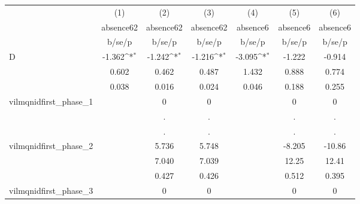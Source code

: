 {
\def\sym#1{\ifmmode^{#1}\else\(^{#1}\)\fi}
\begin{tabular}{l*{6}{c}}
\hline\hline
            &\multicolumn{1}{c}{(1)}&\multicolumn{1}{c}{(2)}&\multicolumn{1}{c}{(3)}&\multicolumn{1}{c}{(4)}&\multicolumn{1}{c}{(5)}&\multicolumn{1}{c}{(6)}\\
            &\multicolumn{1}{c}{absence62}&\multicolumn{1}{c}{absence62}&\multicolumn{1}{c}{absence62}&\multicolumn{1}{c}{absence6}&\multicolumn{1}{c}{absence6}&\multicolumn{1}{c}{absence6}\\
            &      b/se/p         &      b/se/p         &      b/se/p         &      b/se/p         &      b/se/p         &      b/se/p         \\
\hline
D           &      -1.362\sym{*}  &      -1.242\sym{*}  &      -1.216\sym{*}  &      -3.095\sym{*}  &      -1.222         &      -0.914         \\
            &       0.602         &       0.462         &       0.487         &       1.432         &       0.888         &       0.774         \\
            &       0.038         &       0.016         &       0.024         &       0.046         &       0.188         &       0.255         \\
vilmqnidfirst\_phase\_1&                     &           0         &           0         &                     &           0         &           0         \\
            &                     &           .         &           .         &                     &           .         &           .         \\
            &                     &           .         &           .         &                     &           .         &           .         \\
vilmqnidfirst\_phase\_2&                     &       5.736         &       5.748         &                     &      -8.205         &      -10.86         \\
            &                     &       7.040         &       7.039         &                     &       12.25         &       12.41         \\
            &                     &       0.427         &       0.426         &                     &       0.512         &       0.395         \\
vilmqnidfirst\_phase\_3&                     &           0         &           0         &                     &           0         &           0         \\

\end{tabular}}
